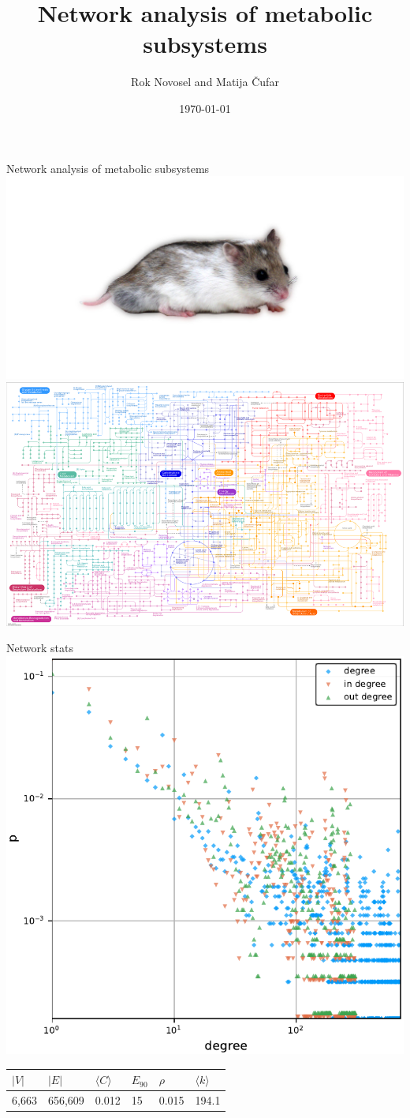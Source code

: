 \documentclass[unknownkeysallowed]{beamer}
\title[Network analysis of metabolic subsystems]{Network analysis of metabolic subsystems}
\author{Rok Novosel and Matija Čufar} %
\institute[]
{
Faculty of Computer and Information Science \\
\medskip
}
\date{\today}
\begin{document}
\begin{frame}
\titlepage %
\end{frame}

\begin{frame}{Network analysis of metabolic subsystems}
  \includegraphics[width=.5\textwidth]{ch}
  \includegraphics[width=.5\textwidth]{network}
\end{frame}

\begin{frame}{Network stats}
  \centering
  \includegraphics[height=.6\textheight]{../../plots/degreesmall2}

  \begin{tabular}{l|l|l|l|l|l}
    $|V|$ & $|E|$ & $\langle C \rangle$ & $E_{90}$ & $\rho$ & $\langle k \rangle$ \\ \hline
    6,663 & 656,609 & 0.012 & 15 & 0.015 & 194.1
  \end{tabular}
\end{frame}
\end{document}
